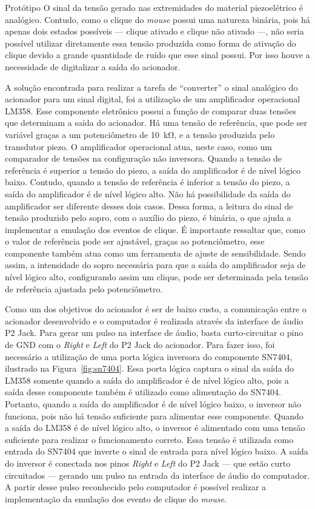 \begin{chapter}{Protótipo}
O sinal da tensão gerado nas extremidades do material piezoelétrico é analógico.
Contudo, como o clique do \textit{mouse} possui uma natureza binária, pois há
apenas dois estados possíveis --- clique ativado e clique não ativado ---, não
seria possível utilizar diretamente essa tensão produzida como forma de ativação
do clique devido a grande quantidade de ruído que esse sinal possui. Por isso 
houve a necessidade de digitalizar a saída do acionador.

A solução encontrada para realizar a tarefa de ``converter'' o sinal analógico
do acionador para um sinal digital, foi a utilização de um amplificador
operacional LM358. Esse componente eletrônico possui a função de comparar duas
tensões que determinam a saída do acionador. Há uma tensão de referência, que
pode ser variável graças a um potenciômetro de 10~k\si{\ohm}, e a tensão
produzida pelo transdutor piezo. O amplificador operacional atua, neste caso,
como um comparador de tensões na configuração não inversora. Quando a tensão de
referência é superior a tensão do piezo, a saída do amplificador é de nível
lógico baixo. Contudo, quando a tensão de referência é inferior a tensão do
piezo, a saída do amplificador é de nível lógico alto. Não há possibilidade da
saída do amplificador ser diferente desses dois casos. Dessa forma, a leitura do
sinal de tensão produzido pelo sopro, com o auxílio do piezo, é binária, o que
ajuda a implementar a emulação dos eventos de clique. É importante ressaltar
que, como o valor de referência pode ser ajustável, graças ao potenciômetro,
esse componente também atua como um ferramenta de ajuste de sensibilidade. Sendo
assim, a intensidade do sopro necessária para que a saída do amplificador seja
de nível lógico alto, configurando assim um clique, pode ser determinada pela
tensão de referência ajustada pelo potenciômetro.

Como um dos objetivos do acionador é ser de baixo custo, a comunicação entre o
acionador desenvolvido e o computador é realizada através da interface de áudio
P2 Jack. Para gerar um pulso na interface de áudio, basta curto-circuitar o pino
de GND com o \textit{Right} e \textit{Left} do P2 Jack do acionador. Para fazer
isso, foi necessário a utilização de uma porta lógica inversora do componente
SN7404, ilustrado na Figura~\ref{fig:sn7404}. Essa porta lógica captura o sinal
da saída do LM358 somente quando a saída do amplificador é de nível lógico alto,
pois a saída desse componente também é utilizado como alimentação do SN7404.
Portanto, quando a saída do amplificador é de nível lógico baixo, o inversor não
funciona, pois não há tensão suficiente para alimentar esse componente. Quando a
saída do LM358 é de nível lógico alto, o inversor é alimentado com uma tensão
suficiente para realizar o funcionamento correto. Essa tensão é utilizada como
entrada do SN7404 que inverte o sinal de entrada para nível lógico baixo. A
saída do inversor é conectada nos pinos  \textit{Right} e \textit{Left} do P2
Jack --- que estão curto circuitados --- gerando um pulso na entrada da
interface de áudio do computador. A partir desse pulso reconhecido pelo
computador é possível realizar a implementação da emulação dos evento de clique
do \textit{mouse}.


\end{chapter}

